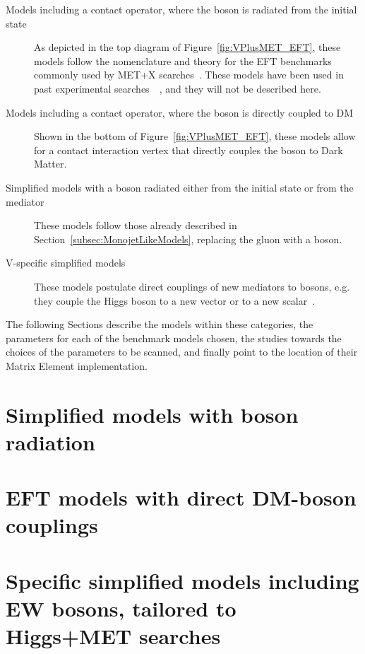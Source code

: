 \begin{description}
 \item[Models including a contact operator, where the boson is radiated from the initial state] As depicted in
 the top diagram of Figure~\ref{fig:VPlusMET_EFT}, these models follow the nomenclature and theory
 for the EFT benchmarks commonly used by MET+X searches~\cite{Goodman:2010ku}. These models
 have been used in past experimental searches~~\cite{Khachatryan:2014rwa, Aad:2014vka,Khachatryan:2014tva, Aad:2014vka,
 ATLAS:2014wra, Aad:2013oja}, and they will not be described here.
 \item[Models including a contact operator, where the boson is directly coupled to DM]
 Shown in the bottom of Figure~\ref{fig:VPlusMET_EFT},
 these models allow for a contact interaction vertex that directly couples the boson to Dark Matter.
 \item[Simplified models with a boson radiated either from the initial state or from the mediator] These models follow those
 already described in Section~\ref{subsec:MonojetLikeModels}, replacing the gluon with a boson.
 \item[V-specific simplified models] These models postulate direct couplings of new mediators
 to bosons, e.g. they couple the Higgs boson to a new vector or to a new scalar~\cite{Carpenter:2013xra,Berlin:2014cfa}. 
\end{description}

The following Sections describe the models within these categories,
the parameters for each of the benchmark models chosen,
the studies towards the choices of the parameters to be scanned,
and finally point to the location of their Matrix Element
implementation.

\section{Simplified models with boson radiation}


\section{EFT models with direct DM-boson couplings}


\section{Specific simplified models including EW bosons, tailored to Higgs+MET searches}


